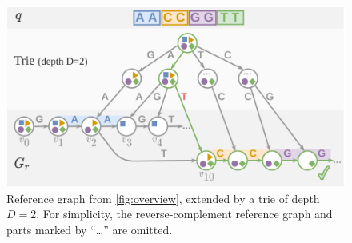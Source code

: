 \begin{figure}[t]
    \centering
	\includegraphics[width=0.6\linewidth]{figures/crumbs-trie.png}
	\caption{Reference graph from \cref{fig:overview}, extended by a trie of
	depth $D=2$. For simplicity, the reverse-complement reference graph and
	parts marked by ``\dots'' are omitted.}
	\label{fig:trie}
\end{figure}